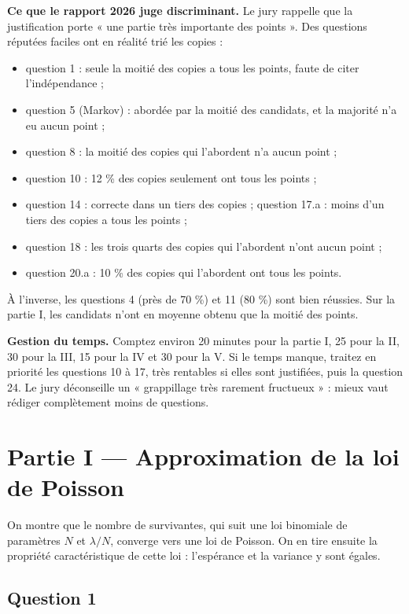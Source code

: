 \documentclass[11pt,a4paper]{article}
\providecommand{\tightlist}{\setlength{\itemsep}{0pt}\setlength{\parskip}{0pt}}
\begin{document}
\textbf{Ce que le rapport 2026 juge discriminant.} Le jury rappelle que la justification porte « une partie très importante des points ». Des questions réputées faciles ont en réalité trié les copies :

\begin{itemize}
\tightlist
\item
  question 1 : seule la moitié des copies a tous les points, faute de citer l'indépendance ;
\item
  question 5 (Markov) : abordée par la moitié des candidats, et la majorité n'a eu aucun point ;
\item
  question 8 : la moitié des copies qui l'abordent n'a aucun point ;
\item
  question 10 : 12 \% des copies seulement ont tous les points ;
\item
  question 14 : correcte dans un tiers des copies ; question 17.a : moins d'un tiers des copies a tous les points ;
\item
  question 18 : les trois quarts des copies qui l'abordent n'ont aucun point ;
\item
  question 20.a : 10 \% des copies qui l'abordent ont tous les points.
\end{itemize}

À l'inverse, les questions 4 (près de 70 \%) et 11 (80 \%) sont bien réussies. Sur la partie I, les candidats n'ont en moyenne obtenu que la moitié des points.

\textbf{Gestion du temps.} Comptez environ 20 minutes pour la partie I, 25 pour la II, 30 pour la III, 15 pour la IV et 30 pour la V. Si le temps manque, traitez en priorité les questions 10 à 17, très rentables si elles sont justifiées, puis la question 24. Le jury déconseille un « grappillage très rarement fructueux » : mieux vaut rédiger complètement moins de questions.

\hypertarget{partie-i-approximation-de-la-loi-de-poisson}{%
\section{Partie I --- Approximation de la loi de Poisson}\label{partie-i-approximation-de-la-loi-de-poisson}}

On montre que le nombre de survivantes, qui suit une loi binomiale de paramètres \(N\) et \(\lambda/N\), converge vers une loi de Poisson. On en tire ensuite la propriété caractéristique de cette loi : l'espérance et la variance y sont égales.

\hypertarget{question-1}{%
\subsection{Question 1}\label{question-1}}
\end{document}

